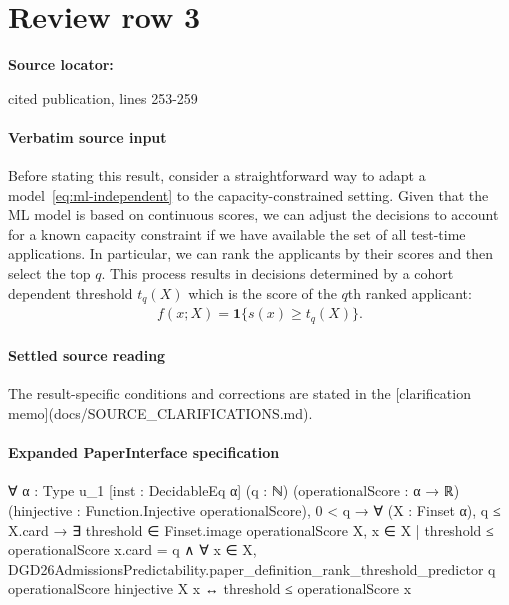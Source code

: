 \documentclass[10pt]{article}
\begin{document}
\section*{Review row 3}
\textbf{Source locator:} {\footnotesize\raggedright cited publication, lines 253-\allowbreak{}259\par}
\paragraph{Verbatim source input}
\begin{ReviewVerbatim}
Before stating this result, consider a straightforward way to adapt a model~\eqref{eq:ml-independent} to the capacity-constrained setting.
Given that the ML model is based on continuous scores, we can adjust the decisions to account for a known capacity constraint if we have available the set of all test-time applications.
In particular, we can rank the applicants by their scores and then select the top $q$.
This process results in decisions determined by a cohort dependent threshold $t_q(X)$ which is the score of the $q$th ranked applicant:
\begin{align}\label{eq:ml-rank}
    f(x; X) = \mathbf 1\{s(x) \geq t_q(X)\}.
\end{align}
\end{ReviewVerbatim}

\paragraph{Settled source reading}
The result-\allowbreak{}specific conditions and corrections are stated in the [clarification memo](docs/\allowbreak{}SOURCE\_\allowbreak{}CLARIFICATIONS.\allowbreak{}md).\allowbreak{}

\paragraph{Expanded PaperInterface specification}
\begin{ReviewVerbatim}
∀ {α : Type u_1} [inst : DecidableEq α] (q : ℕ) (operationalScore : α → ℝ)
  (hinjective : Function.Injective operationalScore),
  0 < q →
    ∀ (X : Finset α),
      q ≤ X.card →
        ∃ threshold ∈ Finset.image operationalScore X,
          {x ∈ X | threshold ≤ operationalScore x}.card = q ∧
            ∀ x ∈ X,
              DGD26AdmissionsPredictability.paper_definition_rank_threshold_predictor q operationalScore hinjective X
                  x ↔
                threshold ≤ operationalScore x
\end{ReviewVerbatim}
\end{document}
